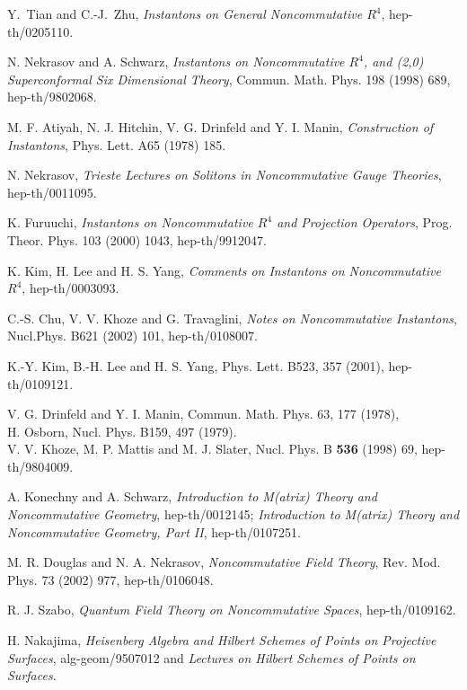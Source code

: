 \documentclass[a4paper,a4paper]{article}
\begin{document}
\begin{thebibliography}{99}

 Y.~Tian and C.-J.~Zhu, {\it Instantons on
General Noncommutative $R^4$}, hep-th/0205110.

 N. Nekrasov and A. Schwarz, {\it Instantons on
Noncommutative $R^4$, and (2,0) Superconformal Six Dimensional
Theory}, Commun. Math. Phys. 198 (1998) 689, hep-th/9802068.

 M. F. Atiyah, N. J. Hitchin, V. G. Drinfeld and Y.
I. Manin, {\it Construction of Instantons}, Phys. Lett. A65 (1978)
185.

 N. Nekrasov, {\it Trieste Lectures on Solitons in
Noncommutative Gauge Theories}, hep-th/0011095.

 K. Furuuchi, {\it Instantons on Noncommutative
$R^4$ and Projection Operators}, Prog. Theor. Phys. 103 (2000)
1043, hep-th/9912047.

 K. Kim, H. Lee and H. S. Yang, {\it Comments on
Instantons on Noncommutative $R^4$}, hep-th/0003093.

 C.-S. Chu, V. V. Khoze and G. Travaglini, {\it
Notes on Noncommutative Instantons}, Nucl.Phys. B621 (2002) 101,
hep-th/0108007.

 K.-Y. Kim, B.-H. Lee and H. S. Yang, Phys.
Lett. B523, 357 (2001), hep-th/0109121.

 V. G. Drinfeld and Y. I. Manin, Commun. Math. Phys. 63, 177 (1978),\\
H. Osborn, Nucl. Phys. B159, 497 (1979).\\
V. V. Khoze, M. P. Mattis and M. J. Slater, Nucl. Phys. B {\bf
536} (1998) 69, hep-th/9804009.

 A. Konechny and A. Schwarz, {\it Introduction to
M(atrix) Theory and Noncommutative Geometry}, hep-th/0012145; {\it
Introduction to M(atrix) Theory and Noncommutative Geometry, Part
II}, hep-th/0107251.

 M. R. Douglas and N. A. Nekrasov, {\it
Noncommutative Field Theory}, Rev. Mod. Phys. 73 (2002) 977,
hep-th/0106048.

 R. J. Szabo, {\it Quantum Field Theory on
Noncommutative Spaces}, hep-th/0109162.

 H. Nakajima, {\it Heisenberg Algebra and Hilbert
Schemes of Points on Projective Surfaces}, alg-geom/9507012 and
{\it Lectures on Hilbert Schemes of Points on Surfaces}.


\end{thebibliography}
\end{document}
